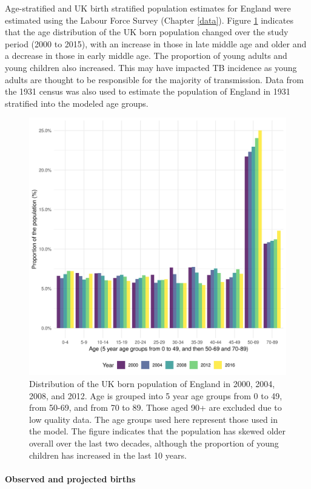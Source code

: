 \documentclass[11pt,twoside]{bristolthesis}
\begin{document}
  Age-stratified and UK birth stratified population estimates for England were estimated using the Labour Force Survey (Chapter \ref{data}). Figure \ref{fig:age-strat-demo} indicates that the age distribution of the UK born population changed over the study period (2000 to 2015), with an increase in those in late middle age and older and a decrease in those in early middle age. The proportion of young adults and young children also increased. This may have impacted TB incidence as young adults are thought to be responsible for the majority of transmission. Data from the 1931 census was also used to estimate the population of England in 1931 stratified into the modeled age groups.
  \begin{figure}
  
  {\centering \includegraphics[width=0.8\linewidth]{chapters/model-development/resources/figure/england_demographics} 
  
  }
  
  \caption{Distribution of the UK born population of England in 2000, 2004, 2008, and 2012. Age is grouped into 5 year age groups from 0 to 49, from 50-69, and from 70 to 89. Those aged 90+ are excluded due to low quality data. The age groups used here represent those used in the model. The figure indicates that the population has skewed older overall over the last two decades, although the proportion of young children has increased in the last 10 years.}\label{fig:age-strat-demo}
  \end{figure}
  \hypertarget{observed-and-projected-births}{%
  \paragraph{Observed and projected births}\label{observed-and-projected-births}}
  
\end{document}
